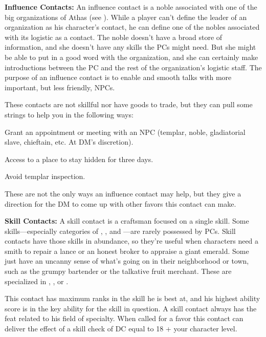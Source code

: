 \textbf{Influence Contacts:} An influence contact is a noble associated with one of the big organizations of Athas (see ). While a player can't define the leader of an organization as his character's contact, he can define one of the nobles associated with its logistic as a contact. The noble doesn't have a broad store of information, and she doesn't have any skills the PCs might need. But she might be able to put in a good word with the organization, and she can certainly make introductions between the PC and the rest of the organization's logistic staff. The purpose of an influence contact is to enable and smooth talks with more important, but less friendly, NPCs.

These contacts are not skillful nor have goods to trade, but they can pull some strings to help you in the following ways: 

\begin{itemize*}
\item Grant an appointment or meeting with an NPC (templar, noble, gladiatorial slave, chieftain, etc. At DM's discretion).
\item Access to a place to stay hidden for three days.
\item Avoid templar inspection.
\end{itemize*}

These are not the only ways an influence contact may help, but they give a direction for the DM to come up with other favors this contact can make.

\textbf{Skill Contacts:} A skill contact is a craftsman focused on a single skill. Some skills---especially categories of , , and ---are rarely possessed by PCs. Skill contacts have those skills in abundance, so they're useful when characters need a smith to repair a lance or an honest broker to appraise a giant emerald. Some just have an uncanny sense of what's going on in their neighborhood or town, such as the grumpy bartender or the talkative fruit merchant. These are specialized in , , or .

This contact has maximum ranks in the skill he is best at, and his highest ability score is in the key ability for the skill in question. A skill contact always has the  feat related to his field of specialty. When called for a favor this contact can deliver the effect of a skill check of DC equal to 18 + \onehalf your character level.

